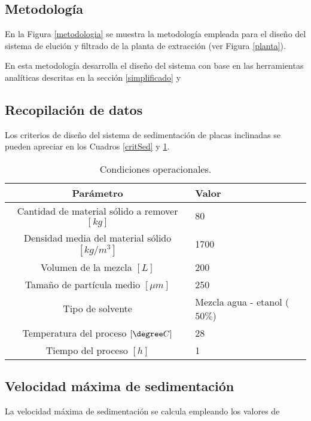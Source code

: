 \begin{center}
	\section{Metodolog\'ia}
\end{center}

\noindent
\justify

En la Figura \ref{metodologia} se muestra la metodolog\'ia empleada para el dise\~no del sistema de eluci\'on y filtrado de la planta de extracci\'on (ver Figura \ref{planta}).



\noindent
\justify

En esta metodolog\'ia desarrolla el dise\~no del sistema con base en las herramientas anal\'iticas descritas en la secci\'on \ref{simplificado} y 

\subsection{Recopilaci\'on de datos}

\noindent
\justify

Los criterios de dise\~no del sistema de sedimentaci\'on de placas inclinadas se pueden apreciar en los Cuadros \ref{critSed} y \ref{condiciones}.

\begin{table}[h!]
	\centering
	\begin{tabular}{c|p{4cm}}
		\hline
		\textbf{Par\'ametro} & \textbf{Valor} \\ \hline
		Cantidad de material s\'olido a remover $[kg]$ & 80 \\ \hline
		Densidad media del material s\'olido $\left[kg / m^3 \right]$ & 1700 \\ \hline
		Volumen de la mezcla $[L]$ & 200 \\ \hline
		Tama\~no de part\'icula medio $[\mu m]$ & 250 \\ \hline
		Tipo de solvente & Mezcla agua - etanol ($50 \%$) \\ \hline
		Temperatura del proceso $[\degree C]$ & 28 \\ \hline
		Tiempo del proceso $[h]$ & 1 \\ \hline
	\end{tabular}
	\caption{Condiciones operacionales.}
	\label{condiciones}
\end{table}



\subsection{Velocidad m\'axima de sedimentaci\'on}

\noindent
\justify

La velocidad m\'axima de sedimentaci\'on se calcula empleando los valores de 

